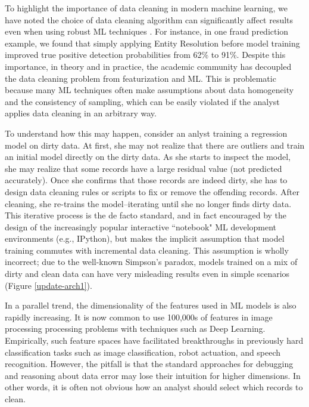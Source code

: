 To highlight the importance of data cleaning in modern machine learning, we have noted the choice of data cleaning algorithm can significantly affect results even when using robust ML techniques \cite{activecleanarxiv, DBLP:conf/case/MahlerKLSMKPWFAG14}.
For instance, in one fraud prediction example, we found that simply applying Entity Resolution before model training improved true positive detection probabilities from 62\% to 91\%. 
Despite this importance, in theory and in practice, the academic community has decoupled the data cleaning problem from featurization and ML.
This is problematic because many ML techniques often make assumptions about data homogeneity and the consistency of sampling, which can be easily violated if the analyst applies data cleaning in an arbitrary way.

To understand how this may happen, consider an anlyst training a regression model on dirty data. At first, she may not realize that there are outliers and train an initial model directly on the dirty data. 
As she starts to inspect the model, she may realize that some records have a large residual value (not predicted accurately). 
Once she confirms that those records are indeed dirty, she has to design data cleaning rules or scripts to fix or remove the offending records. 
After cleaning, she re-trains the model--iterating until she no longer finds dirty data.
This iterative process is the de facto standard, and in fact encouraged by the design of the increasingly popular interactive ``notebook" ML development environments (e.g., IPython), but makes the implicit assumption that model training commutes with incremental data cleaning.
This assumption is wholly incorrect; due to the well-known Simpson's paradox, models trained on a mix of dirty and clean data can have very misleading results even in simple scenarios (Figure \ref{update-arch1}).

In a parallel trend, the dimensionality of the features used in ML models is also rapidly increasing. 
It is now common to use 100,000s of features in image processing processing problems with techniques such as Deep Learning.
Empirically, such feature spaces have facilitated breakthroughs in previously hard classification tasks such as image classification, robot actuation, and speech recognition.
However, the pitfall is that the standard approaches for debugging and reasoning about data error may lose their intuition for higher dimensions.
In other words, it is often not obvious how an analyst should select which records to clean.

